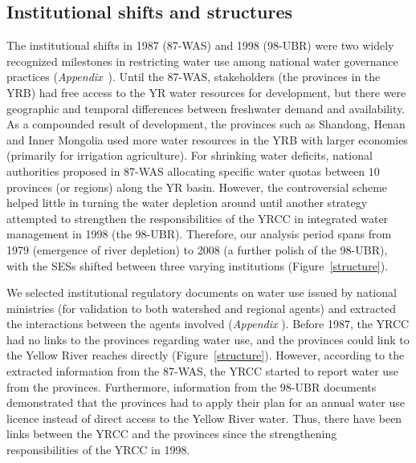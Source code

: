 
\subsection{Institutional shifts and structures}
\label{results-1}

The institutional shifts in 1987 (87-WAS) and 1998 (98-UBR) were two widely recognized milestones in restricting water use among national water governance practices (\textit{Appendix}~).
Until the 87-WAS, stakeholders (the provinces in the YRB) had free access to the YR water resources for development, but there were geographic and temporal differences between freshwater demand and availability.
As a compounded result of development, the provinces such as Shandong, Henan and Inner Mongolia used more water resources in the YRB with larger economies (primarily for irrigation agriculture).
For shrinking water deficits, national authorities proposed in 87-WAS allocating specific water quotas between $10$ provinces (or regions) along the YR basin.
However, the controversial scheme helped little in turning the water depletion around until another strategy attempted to strengthen the responsibilities of the YRCC in integrated water management in 1998 (the 98-UBR).
Therefore, our analysis period spans from 1979 (emergence of river depletion) to 2008 (a further polish of the 98-UBR), with the SESs shifted between three varying institutions (Figure~\ref{structure}).

We selected institutional regulatory documents on water use issued by national ministries (for validation to both watershed and regional agents) and extracted the interactions between the agents involved (\textit{Appendix }).
Before 1987, the YRCC had no links to the provinces regarding water use, and the provinces could link to the Yellow River reaches directly (Figure~\ref{structure}).
However, according to the extracted information from the 87-WAS, the YRCC started to report water use from the provinces.
Furthermore, information from the 98-UBR documents demonstrated that the provinces had to apply their plan for an annual water use licence instead of direct access to the Yellow River water.
Thus, there have been links between the YRCC and the provinces since the strengthening responsibilities of the YRCC in 1998.

